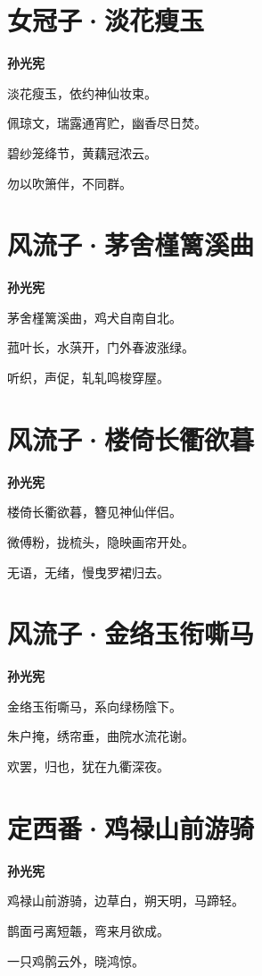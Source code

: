 \documentclass[12pt,a4paper]{ctexbook}
\begin{document}
\section{女冠子·淡花瘦玉}
\textbf{孙光宪}\par\vspace{0.5em}
淡花瘦玉，依约神仙妆束。\par
佩琼文，瑞露通宵贮，幽香尽日焚。\par
碧纱笼绛节，黄藕冠浓云。\par
勿以吹箫伴，不同群。\par

\section{风流子·茅舍槿篱溪曲}
\textbf{孙光宪}\par\vspace{0.5em}
茅舍槿篱溪曲，鸡犬自南自北。\par
菰叶长，水葓开，门外春波涨绿。\par
听织，声促，轧轧鸣梭穿屋。\par

\section{风流子·楼倚长衢欲暮}
\textbf{孙光宪}\par\vspace{0.5em}
楼倚长衢欲暮，簪见神仙伴侣。\par
微傅粉，拢梳头，隐映画帘开处。\par
无语，无绪，慢曳罗裙归去。\par

\section{风流子·金络玉衔嘶马}
\textbf{孙光宪}\par\vspace{0.5em}
金络玉衔嘶马，系向绿杨陰下。\par
朱户掩，绣帘垂，曲院水流花谢。\par
欢罢，归也，犹在九衢深夜。\par

\section{定西番·鸡禄山前游骑}
\textbf{孙光宪}\par\vspace{0.5em}
鸡禄山前游骑，边草白，朔天明，马蹄轻。\par
鹊面弓离短韔，弯来月欲成。\par
一只鸡鹘云外，晓鸿惊。\par
\end{document}
